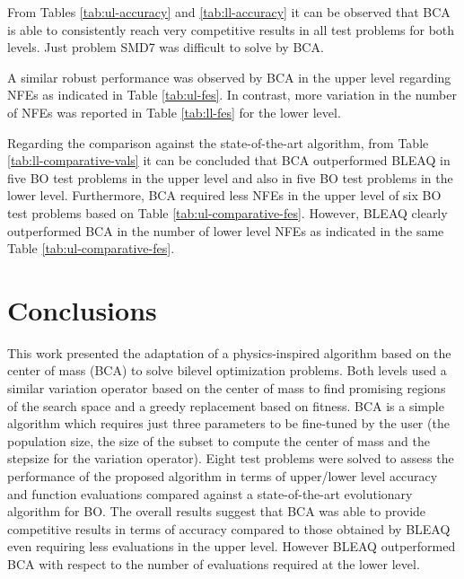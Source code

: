\documentclass[conference]{IEEEtran}
\begin{document}
From Tables \ref{tab:ul-accuracy} and \ref{tab:ll-accuracy} it can be observed
that BCA is able to consistently reach very competitive results in all test problems
for both levels. Just problem SMD7 was difficult to solve by BCA. 

A similar robust performance was observed by BCA in the upper level regarding NFEs
as indicated in Table \ref{tab:ul-fes}. In contrast, more variation in the number
of NFEs was reported in Table \ref{tab:ll-fes} for the lower level. 



Regarding the comparison against the state-of-the-art algorithm, from Table \ref{tab:ll-comparative-vals}
it can be concluded that BCA outperformed BLEAQ in five BO test problems in the
upper level and also in five BO test problems in the lower level. Furthermore,
BCA required less NFEs in the upper level of six BO test problems based on
Table \ref{tab:ul-comparative-fes}. However, BLEAQ clearly outperformed BCA in
the number of lower level NFEs as indicated in the same Table \ref{tab:ul-comparative-fes}.



\section{Conclusions}
\label{sec:conclu}

This work presented the adaptation of a physics-inspired algorithm based on the
center of mass (BCA) to solve bilevel optimization problems. Both levels used a
similar variation operator based on the center of mass to find promising regions
of the search space and a greedy replacement based on fitness. BCA is a simple
algorithm which requires just three parameters to be fine-tuned by the user (the
population size, the size of the subset to compute the center of mass and the
stepsize for the variation operator). Eight test problems were solved to assess
the performance of the proposed algorithm in terms of upper/lower level accuracy
and function evaluations compared against a state-of-the-art evolutionary algorithm
for BO. The overall results suggest that BCA was able to provide competitive
results in terms of accuracy compared to those obtained by BLEAQ even requiring
less evaluations in the upper level. However BLEAQ outperformed BCA with respect
to the number of evaluations required at the lower level.
\end{document}
